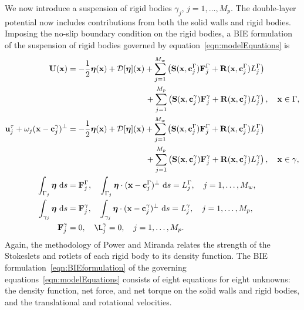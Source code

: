 \documentclass[preprint, 10pt]{elsarticle}
\begin{document}
We now introduce a suspension of rigid bodies $\gamma_j$,
$j=1,\ldots,M_p$.  The double-layer potential now includes contributions
from both the solid walls and rigid bodies.  Imposing the no-slip
boundary condition on the rigid bodies, a BIE formulation of the
suspension of rigid bodies governed by
equation~\eqref{eqn:modelEquations} is
\begin{subequations}
  \label{eqn:BIEformulation}
  \begin{align}
    \UU(\xx) &= -\frac{1}{2}\eeta(\xx) + \DD[\eeta](\xx) +
    \sum_{j=1}^{M_w} \left(\mathbf{S}(\xx,\cc^\Gamma_j)\FF^\Gamma_j + 
      \mathbf{R}(\xx,\cc^\Gamma_j)L^\Gamma_j\right)  \nonumber \\
&\hspace{96pt}+\sum_{j=1}^{M_p} \left(\mathbf{S}(\xx,\cc^\gamma_j)\FF^\gamma_j +
\mathbf{R}(\xx,\cc^\gamma_j)L^\gamma_j\right),
    \quad \xx \in \Gamma, \label{eqn:BIEformulation1} \\
  \uu^\tau_j + \omega_j(\xx - \cc_j^\gamma)^\perp &=
    -\frac{1}{2}\eeta(\xx) + \DD[\eeta](\xx) + 
    \sum_{j=1}^{M_w} \left(\mathbf{S}(\xx,\cc^\Gamma_j)\FF^\Gamma_j + 
      \mathbf{R}(\xx,\cc^\Gamma_j)L^\Gamma_j\right) \nonumber \\
&\hspace{96pt}+\sum_{j=1}^{M_p} \left(\mathbf{S}(\xx,\cc^\gamma_j)\FF^\gamma_j +
\mathbf{R}(\xx,\cc^\gamma_j)L^\gamma_j\right),
    \quad \xx \in \gamma, \label{eqn:BIEformulation2} \\
  \int_{\Gamma_j} \eeta~\text{d}s &= \FF^\Gamma_j, \quad
  \int_{\Gamma_j} \eeta\cdot (\xx - \cc^\Gamma_j)^\perp~\text{d}s =
  L^\Gamma_j, \quad j=1,\ldots,M_w, \label{eqn:BIEformulation3} \\
  \int_{\gamma_j} \eeta~\text{d}s &= \FF^\gamma_j, \quad
  \int_{\gamma_j} \eeta\cdot (\xx - \cc^\gamma_j)^\perp~\text{d}s =
  L^\gamma_j,\quad j=1,\ldots,M_p, \label{eqn:BIEformulation4} \\
  \FF^\gamma_j &= 0, \quad \L^\gamma_j = 0,\quad j=1,\ldots,M_p.
  \label{eqn:BIEformulation5}
\end{align}
\end{subequations}
Again, the methodology of Power and Miranda relates the strength of the
Stokeslets and rotlets of each rigid body to its density function.  The
BIE formulation~\eqref{eqn:BIEformulation} of the governing
equations~\eqref{eqn:modelEquations} consists of eight equations for
eight unknowns: the density function, net force, and net torque on the
solid walls and rigid bodies, and the translational and rotational
velocities.
\end{document}
